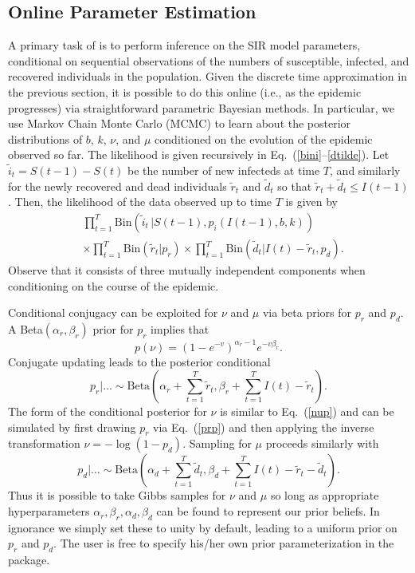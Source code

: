 \documentclass[shortnames,nojss]{jss}
\begin{document}
\subsection{Online Parameter Estimation}
\label{sec:estimate}

A primary task of  is to perform inference on the SIR model
parameters, conditional on sequential observations of the numbers of
susceptible, infected, and recovered individuals in the population.
Given the discrete time approximation in the previous section, it is
possible to do this online (i.e., as the epidemic progresses) via
straightforward parametric Bayesian methods.  In particular, we use
Markov Chain Monte Carlo (MCMC) \citep[e.g.,][]{gamerman06} to learn
about the posterior distributions of $b$, $k$, $\nu$, and $\mu$
conditioned on the evolution of the epidemic observed so far.  The
likelihood is given recursively in
Eq.~(\ref{bini}--\ref{dtilde}). %
Let $\tilde{i}_t = S(t-1) - S(t)$ be the number of new infecteds at
time $T$, and similarly for the newly recovered and dead individuals
$\tilde{r}_t$ and $\tilde{d}_t$ so that $\tilde{r}_t + \tilde{d}_t
\leq I(t-1)$.  Then, the likelihood of the data observed up to time
$T$ is given by
\begin{align*}
&\prod_{t=1}^T \mbox{Bin}(\tilde{i}_t \,| S(t-1), p_i(I(t-1),b,k))\\
&\times \prod_{t=1}^T \mbox{Bin}(\tilde{r}_t | p_r)
\times \prod_{t=1}^T \mbox{Bin}(\tilde{d}_t | I(t)-\tilde{r}_t, p_d).
\end{align*}
Observe that it consists of three mutually independent components when
conditioning on the course of the epidemic.

Conditional conjugacy can be exploited for $\nu$ and $\mu$ via beta
priors for $p_r$ and $p_d$. A Beta$(\alpha_r, \beta_r)$ prior for
$p_r$ implies that
\begin{equation}
p(\nu) = (1-e^{-v})^{\alpha_r-1} e^{-v\beta_r}. \label{nup}
\end{equation}
Conjugate updating leads to the posterior conditional
\begin{equation}
p_r|\dots \sim \mbox{Beta}(\alpha_r + 
\textstyle \sum_{t=1}^T \tilde{r}_t, 
\beta_r + \sum_{t=1}^T I(t)- \tilde{r}_t). \label{prp}
\end{equation}
The form of the conditional posterior for $\nu$ is similar to
Eq.~(\ref{nup}) and can be simulated by first drawing $p_r$ via
Eq.~(\ref{prp}) and then applying the inverse transformation $\nu =
-\log(1-p_d)$.  Sampling for $\mu$ proceeds similarly with
\begin{equation}
p_d|\dots \sim \mbox{Beta}(\alpha_d + 
\textstyle \sum_{t=1}^T \tilde{d}_t, 
\beta_d + \sum_{t=1}^T I(t) - \tilde{r}_t - \tilde{d}_t).
\end{equation}
Thus it is possible to take Gibbs samples for $\nu$ and $\mu$ so long
as appropriate hyperparameters $\alpha_r, \beta_r, \alpha_d, \beta_d$
can be found to represent our prior beliefs.  In ignorance we simply
set these to unity by default, leading to a uniform prior on $p_r$ and
$p_d$.  The user is free to specify his/her own prior parameterization
in the package.
\end{document}
